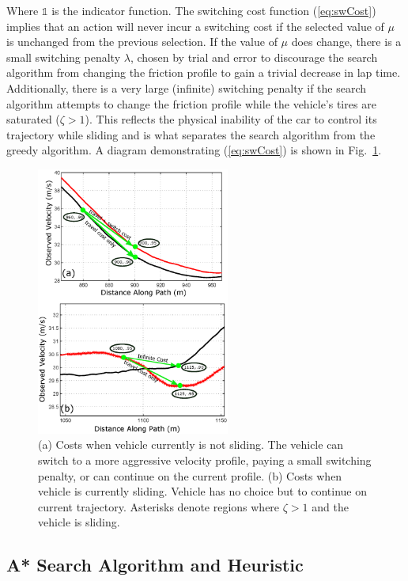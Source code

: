 \documentclass[9pt,shortpaper,twoside,web]{ieeecolor}
\begin{document}
{{{Where $\mathds{1}$ is the indicator function. The switching cost function (\ref{eq:swCost}) implies that an action will never
incur a switching cost if the selected value of $\mu$ is unchanged from the previous selection. If the value of $\mu$ does change, there
is a small switching penalty $\lambda$, chosen by trial and error to discourage the search algorithm from changing the friction profile to gain a
trivial decrease in lap time. Additionally, there is a very large (infinite) switching penalty if the search algorithm attempts to change the
friction profile while the vehicle's tires are saturated ($\zeta > 1$). This reflects the physical inability of the car to control its
trajectory while sliding and is what separates the search algorithm from the greedy algorithm. A diagram demonstrating (\ref{eq:swCost})
is shown in Fig.~\ref{fig:swCost}. 

 \begin{figure}[tb]
\centering
\includegraphics[width=2.5in]{figures/switchCost.eps}
\caption[Costs when vehicle is and is not sliding.]{(a) Costs when vehicle currently is not sliding. The vehicle can switch to a more aggressive velocity profile, paying a small
switching penalty, or can continue on the current profile. (b) Costs when vehicle is currently sliding. Vehicle has no choice but to continue on current
trajectory. Asterisks denote regions where $\zeta > 1$ and the vehicle is sliding.}
\label{fig:swCost}
\end{figure} 

\subsection{A* Search Algorithm and Heuristic}
\label{sec:ch5astarheuristic}

}}}
\end{document}

